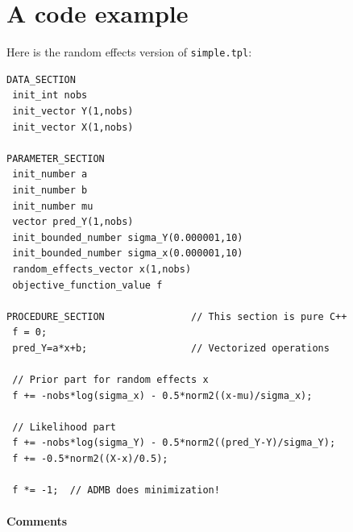 \documentclass{admbmanual}
\begin{document}
\section{A code example\label{sec:code example}}

Here is the random effects version of \texttt{simple.tpl}:
\begin{lstlisting}
DATA_SECTION
 init_int nobs
 init_vector Y(1,nobs)
 init_vector X(1,nobs)

PARAMETER_SECTION
 init_number a
 init_number b
 init_number mu
 vector pred_Y(1,nobs)
 init_bounded_number sigma_Y(0.000001,10)
 init_bounded_number sigma_x(0.000001,10)
 random_effects_vector x(1,nobs)
 objective_function_value f

PROCEDURE_SECTION               // This section is pure C++
 f = 0;
 pred_Y=a*x+b;                  // Vectorized operations

 // Prior part for random effects x
 f += -nobs*log(sigma_x) - 0.5*norm2((x-mu)/sigma_x);

 // Likelihood part
 f += -nobs*log(sigma_Y) - 0.5*norm2((pred_Y-Y)/sigma_Y);
 f += -0.5*norm2((X-x)/0.5);

 f *= -1;  // ADMB does minimization!
\end{lstlisting}

\paragraph{Comments}
\end{document}

